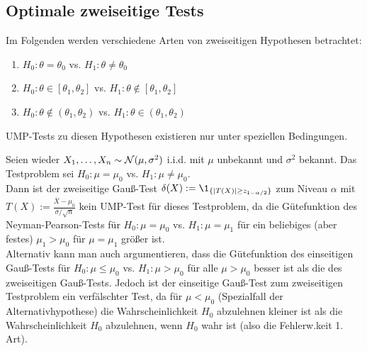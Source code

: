 \subsection{%
    Optimale zweiseitige Tests%
}

\begin{Bem}
    Im Folgenden werden verschiedene Arten von zweiseitigen Hypothesen betrachtet:
    \begin{enumerate}[label=\arabic*.]
        \item
        $H_0\colon \theta = \theta_0$ vs.
        $H_1\colon \theta \not= \theta_0$

        \item
        $H_0\colon \theta \in [\theta_1, \theta_2]$ vs.
        $H_1\colon \theta \notin [\theta_1, \theta_2]$

        \item
        $H_0\colon \theta \notin (\theta_1, \theta_2)$ vs.
        $H_1\colon \theta \in (\theta_1, \theta_2)$
    \end{enumerate}
    UMP-Tests zu diesen Hypothesen existieren nur unter speziellen Bedingungen.
\end{Bem}

\begin{Bsp}
    Seien wieder $X_1, \dotsc, X_n \sim \mathcal{N}(\mu, \sigma^2)$ i.i.d. mit $\mu$ unbekannt und
    $\sigma^2$ bekannt.
    Das Testproblem sei $H_0\colon \mu = \mu_0$ vs. $H_1\colon \mu \not= \mu_0$.\\
    Dann ist der zweiseitige Gauß-Test $\delta(X) := \1_{\{|T(X)| \ge z_{1-\alpha/2}\}}$
    zum Niveau $\alpha$ mit $T(X) := \frac{\overline{X} - \mu_0}{\sigma/\sqrt{n}}$
    kein UMP-Test für dieses Testproblem,
    da die Gütefunktion des Neyman-Pearson-Tests für
    $H_0\colon \mu = \mu_0$ vs. $H_1\colon \mu = \mu_1$ für ein beliebiges (aber festes)
    $\mu_1 > \mu_0$ für $\mu = \mu_1$ größer ist.\\
    Alternativ kann man auch argumentieren, dass die Gütefunktion des einseitigen Gauß-Tests für
    $H_0\colon \mu \le \mu_0$ vs. $H_1\colon \mu > \mu_0$ für alle $\mu > \mu_0$ besser ist
    als die des zweiseitigen Gauß-Tests.
    Jedoch ist der einseitige Gauß-Test zum zweiseitigen Testproblem ein verfälschter Test,
    da für $\mu < \mu_0$ (Spezialfall der Alternativhypothese) die Wahrscheinlichkeit
    $H_0$ abzulehnen kleiner ist als die Wahrscheinlichkeit $H_0$ abzulehnen, wenn $H_0$
    wahr ist (also die Fehlerw.keit 1. Art).
\end{Bsp}

